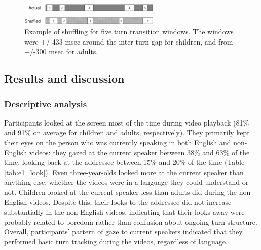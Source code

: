 \documentclass[authoryear, 12pt]{elsarticle}
\begin{document}
\begin{figure}[t]
\begin{center}
\includegraphics[width=0.6\textwidth]{figures/FIG-ShuffledWindows.png}
\end{center}
\caption{Example of shuffling for five turn transition windows. The windows were +/-433 msec around the inter-turn gap for children, and from +/-300 msec for adults.} 
\label{fig:shuffling}
\end{figure}

\subsection{Results and discussion}
\label{sec:results1}

\subsubsection{Descriptive analysis}

Participants looked at the screen most of the time during video playback (81\% and 91\% on average for children and adults, respectively). They primarily kept their eyes on the person who was currently speaking in both English and non-English videos: they gazed at the current speaker between 38\% and 63\% of the time, looking back at the addressee between 15\% and 20\% of the time (Table \ref{tab:e1_look}). Even three-year-olds looked more at the current speaker than anything else, whether the videos were in a language they could understand or not. Children looked at the current speaker less than adults did during the non-English videos. Despite this, their looks to the addressee did not increase substantially in the non-English videos, indicating that their looks away were probably related to boredom rather than confusion about ongoing turn structure. Overall, participants' pattern of gaze to current speakers indicated that they performed basic turn tracking during the videos, regardless of language.
\end{document}
